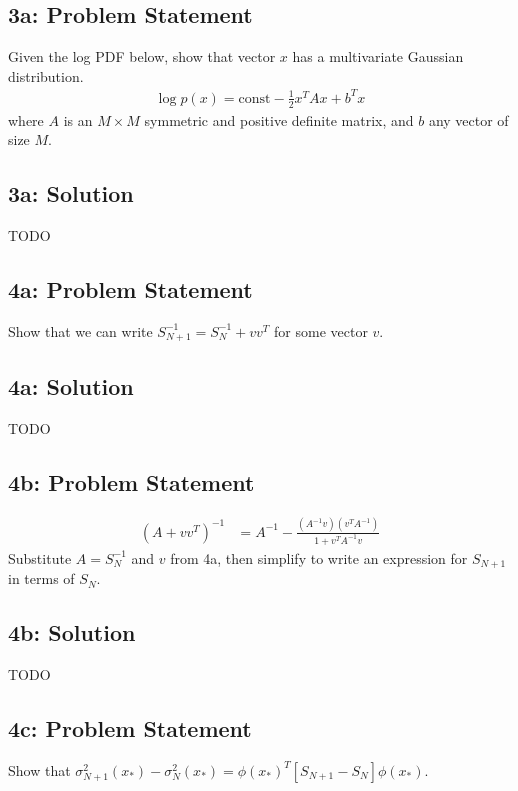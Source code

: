 \documentclass[12pt]{article}
\newcommand{\officialdirections}[1]{{\color{blue} #1}}
\begin{document}
\newpage
\officialdirections{
\subsection*{3a: Problem Statement}
Given the log PDF below, show that vector $x$ has a multivariate Gaussian distribution.
\begin{align}
\log p(x) = \text{const} - \frac{1}{2} x^T A x + b^T x
\end{align}
where $A$ is an $M \times M$ symmetric and positive definite matrix, and $b$ any vector of size $M$.
}


\subsection{3a: Solution}
TODO




\newpage
\officialdirections{
\subsection*{4a: Problem Statement}
Show that we can write $S_{N+1}^{-1} = S_N^{-1} + vv^T$ for some vector $v$.
}

\subsection{4a: Solution}
TODO

\newpage
\officialdirections{
\subsection*{4b: Problem Statement}
\begin{align}
(A + vv^T)^{-1} &= A^{-1} - \frac{ (A^{-1}v)(v^T A^{-1})}{ 1 + v^T A^{-1} v}
\end{align}
Substitute $A = S_N^{-1}$ and $v$ from 4a, then simplify to write an expression for $S_{N+1}$ in terms of $S_{N}$.
}

\subsection{4b: Solution}
TODO

\newpage
\officialdirections{
\subsection*{4c: Problem Statement}
Show that $\sigma^2_{N+1}(x_*) - \sigma^2_{N}(x_*) = \phi(x_*)^T \left[ S_{N+1} - S_{N} \right] \phi(x_*)$.
}
\end{document}
